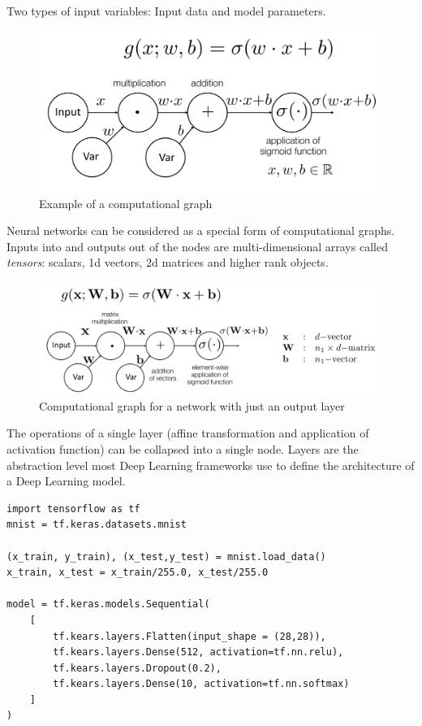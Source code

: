 \documentclass[11pt]{article}
\begin{document}
\noindent
Two types of input variables: Input data and model parameters.

\begin{figure}[tbh]
	\centering
	\includegraphics[width=0.6\linewidth]{computational_graph}
	\caption{Example of a computational graph}
	\label{fig:computationalgraph}
\end{figure}

Neural networks can be considered as a special form of computational graphs. Inputs into and outputs out of the nodes are multi-dimensional arrays called \emph{tensors}: scalars, 1d vectors, 2d matrices and higher rank objects.

\begin{figure}[tbh]
	\centering
	\includegraphics[width=0.6\linewidth]{img/computational_graph_output_layer}
	\caption{Computational graph for a network with just an output layer}
	\label{fig:computationalgraphoutputlayer}
\end{figure}

The operations of a single layer (affine transformation and application of activation function) can be collapsed into a single node. Layers are the abstraction level most Deep Learning frameworks use to define the architecture of a Deep Learning model.

\begin{verbatim}
import tensorflow as tf
mnist = tf.keras.datasets.mnist

(x_train, y_train), (x_test,y_test) = mnist.load_data()
x_train, x_test = x_train/255.0, x_test/255.0

model = tf.keras.models.Sequential(
	[
		tf.kears.layers.Flatten(input_shape = (28,28)),
		tf.kears.layers.Dense(512, activation=tf.nn.relu),
		tf.kears.layers.Dropout(0.2),
		tf.kears.layers.Dense(10, activation=tf.nn.softmax)
	]
)
\end{verbatim}
\end{document}
